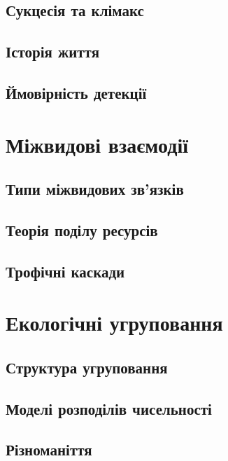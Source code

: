 \documentclass[
  11pt,
]{book}
\begin{document}
\section{Сукцесія та клімакс}\label{succession}

\section{Історія життя}\label{life-history}

\section{Ймовірність детекції}\label{detectability}

\chapter{Міжвидові взаємодії}\label{interspecific}

\section{Типи міжвидових зв'язків}\label{relationships}

\section{Теорія поділу ресурсів}\label{rstar}

\section{Трофічні каскади}\label{cascade}

\chapter{Екологічні угруповання}\label{comecol}

\section{Структура угруповання}\label{sad}

\section{Моделі розподілів чисельності}\label{sad-model}

\section{Різноманіття}\label{diversity}
\end{document}
